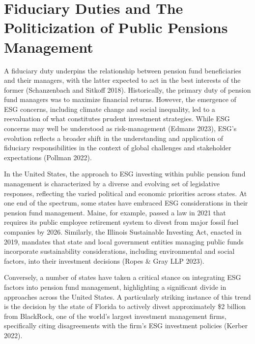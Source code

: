 \documentclass[
  12pt,
]{article}
\begin{document}
\hypertarget{fiduciary-duties-and-the-politicization-of-public-pensions-management}{%
\section{Fiduciary Duties and The Politicization of Public Pensions Management}\label{fiduciary-duties-and-the-politicization-of-public-pensions-management}}

A fiduciary duty underpins the relationship between pension fund beneficiaries and their managers, with the latter expected to act in the best interests of the former (Schanzenbach and Sitkoff 2018). Historically, the primary duty of pension fund managers was to maximize financial returns. However, the emergence of ESG concerns, including climate change and social inequality, led to a reevaluation of what constitutes prudent investment strategies. While ESG concerns may well be understood as risk-management (Edmans 2023), ESG's evolution reflects a broader shift in the understanding and application of fiduciary responsibilities in the context of global challenges and stakeholder expectations (Pollman 2022).

In the United States, the approach to ESG investing within public pension fund management is characterized by a diverse and evolving set of legislative responses, reflecting the varied political and economic priorities across states. At one end of the spectrum, some states have embraced ESG considerations in their pension fund management. Maine, for example, passed a law in 2021 that requires its public employee retirement system to divest from major fossil fuel companies by 2026. Similarly, the Illinois Sustainable Investing Act, enacted in 2019, mandates that state and local government entities managing public funds incorporate sustainability considerations, including environmental and social factors, into their investment decisions (Ropes \& Gray LLP 2023).

Conversely, a number of states have taken a critical stance on integrating ESG factors into pension fund management, highlighting a significant divide in approaches across the United States. A particularly striking instance of this trend is the decision by the state of Florida to actively divest approximately \$2 billion from BlackRock, one of the world's largest investment management firms, specifically citing disagreements with the firm's ESG investment policies (Kerber 2022).
\end{document}
